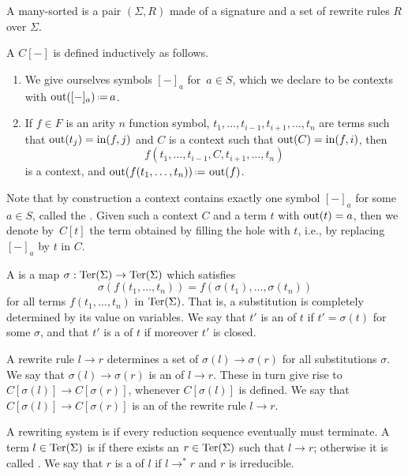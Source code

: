 \begin{definition}
  A many-sorted  is a pair $(\Sigma,R)$ made of a signature and a set of rewrite rules $R$ over $\Sigma$.
\end{definition}

A  $C[-]$ is defined inductively as follows.
\begin{enumerate}
  \item We give ourselves symbols $[-]_a$ for~$a\in S$, which we declare to be contexts with $\outsort([-]_a) \eqdef a$.
  \item If $f \in F$ is an arity $n$ function symbol, $t_1,\ldots,t_{i-1},t_{i+1},\ldots,t_n$ are terms such that $\operatorname{out}(t_j)=\operatorname{in}(f,j)$ and $C$ is a context such that $\operatorname{out}(C)=\operatorname{in}(f,i)$, then 
  $$f(t_1,\ldots,t_{i-1},C,t_{i+1},\ldots,t_n)$$
   is a context, and $\outsort(f(t_1,\ldots,t_n))\eqdef \outsort(f)$.
\end{enumerate}
Note that by construction a context contains exactly one symbol $[-]_a$ for some $a \in S$, called the .
Given such a context $C$ and a term $t$ with $\operatorname{out}(t)=a$, then we denote by~$C[t]$ the term obtained by  filling the hole with $t$, i.e., by replacing $[-]_a$ by $t$ in $C$.

A  is a map $\sigma : \operatorname{Ter}(\Sigma) \to \operatorname{Ter}(\Sigma)$ which satisfies $$\sigma(f(t_1,\ldots,t_n))=f(\sigma(t_1),\ldots,\sigma(t_n))$$ for all terms $f(t_1,\ldots,t_n)$ in $\operatorname{Ter}(\Sigma)$.
That is, a substitution is completely determined by its value on variables. We say that $t'$ is an  of $t$ if
$t'=\sigma(t)$ for some $\sigma$, and that $t'$ is a  of $t$ if moreover $t'$ is closed.


A rewrite rule $l \to r$ determines a set of  $\sigma(l)\to \sigma(r)$ for all substitutions $\sigma$. 
We say that $\sigma(l)\to \sigma(r)$ is an  of $l \to r$.
These in turn give rise to  $C[\sigma(l)] \to C[\sigma(r)]$, whenever $C[\sigma(l)]$ is defined. 
We say that $C[\sigma(l)] \to C[\sigma(r)]$ is an  of the rewrite rule $l \to r$.

A rewriting system is  if every reduction sequence eventually must terminate.
A term $l \in \operatorname{Ter}(\Sigma)$ is  if there exists an $r \in \operatorname{Ter}(\Sigma)$ such that $l \to r$; otherwise it is called  .
We say that $r$ is a  of $l$ if $l \to^* r$ and $r$ is irreducible.

